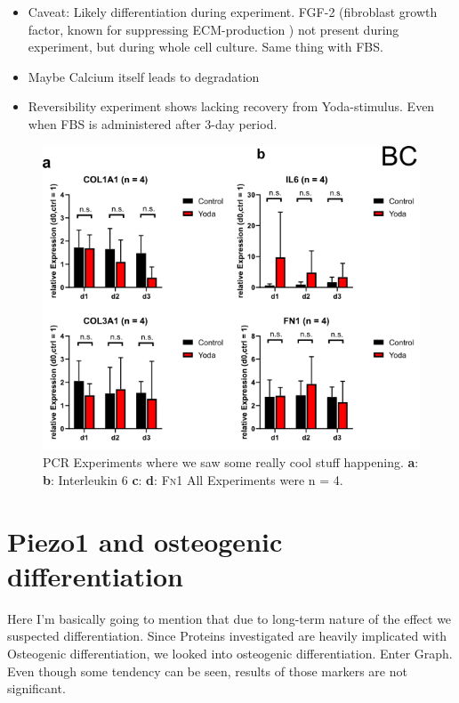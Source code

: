 \begin{itemize}
     \item  Caveat: Likely differentiation during experiment. FGF-2 (fibroblast growth factor, known for suppressing ECM-production ) not present during experiment, but during whole cell culture. Same thing with FBS. 
     
     \item Maybe Calcium itself leads to degradation
    
    \item Reversibility experiment shows lacking recovery from Yoda-stimulus. Even when FBS is administered after 3-day period.
\end{itemize}



\begin{figure}[ht]
    \centering
    \includegraphics[scale = 0.6]{Collection.png}
    \caption{
    PCR Experiments where we saw some really cool stuff happening.
    \textbf{a}: \colone{ }
    \textbf{b}: Interleukin 6
    \textbf{c}: \colthree{ }
    \textbf{d}: \textsc{Fn}1
    All Experiments were n = 4. 
    }
    \label{fig:my_label}
\end{figure}

\section{Piezo1 and osteogenic differentiation}
Here I'm basically going to mention that due to long-term nature of the effect we suspected differentiation. Since Proteins investigated are heavily implicated with Osteogenic differentiation, we looked into osteogenic differentiation. Enter Graph. Even though some tendency can be seen, results of those markers are not significant. 


